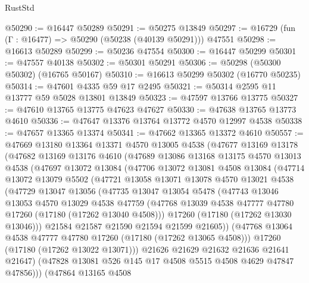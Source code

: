\begin{lexlean}{RustStd}
\begin{coremodule}
@50290 := @16447 @50289
@50291 := @50275 @13849
@50297 := @16729 (fun (Γ : @16477) => @50290 (@50238 (@40139 @50291))) @47551
@50298 := @16613 @50289
@50299 := @50236 @47554
@50300 := @16447 @50299
@50301 := @47557 @40138
@50302 := @50301 @50291
@50306 := @50298 (@50300 @50302) (@16765 @50167)
@50310 := @16613 @50299 @50302 (@16770 @50235)
@50314 := @47601 @4335 @59 @17 @2495
@50321 := @50314 @2595 @11 @13777 @59 @5028 @13801 @13849
@50323 := @47597 @13766 @13775
@50327 := @47610 @13765 @13775 @47623 @47627
@50330 := @47638 @13765 @13773 @4610
@50336 := @47647 @13376 @13764 @13772 @4570 @12997 @4538
@50338 := @47657 @13365 @13374
@50341 := @47662 @13365 @13372 @4610
@50557 := @47669
    @13180
    @13364
    @13371
    @4570
    @13005
    @4538
    (@47677
      @13169
      @13178
      (@47682
        @13169
        @13176
        @4610
        (@47689
          @13086
          @13168
          @13175
          @4570
          @13013
          @4538
          (@47697
            @13072
            @13084
            (@47706
              @13072
              @13081
              @4508
              @13084
              (@47714
                @13072
                @13079
                @5502
                (@47721
                  @13058
                  @13071
                  @13078
                  @4570
                  @13021
                  @4538
                  (@47729
                    @13047
                    @13056
                    (@47735
                      @13047
                      @13054
                      @5478
                      (@47743
                        @13046
                        @13053
                        @4570
                        @13029
                        @4538
                        @47759
                        (@47768 @13039 @4538 @47777 @47780 @17260 (@17180 (@17262 @13040 @4508)))
                        @17260
                        (@17180 (@17262 @13030 @13046)))
                      @21584
                      @21587
                      @21590
                      @21594
                      @21599
                      @21605))
                  (@47768 @13064 @4538 @47777 @47780 @17260 (@17180 (@17262 @13065 @4508)))
                  @17260
                  (@17180 (@17262 @13022 @13071)))
                @21626
                @21629
                @21632
                @21636
                @21641
                @21647)
              (@47828 @13081 @526 @145 @17 @4508 @5515 @4508 @4629 @47847 @47856)))
          (@47864
            @13165
            @4508

\end{coremodule}
\end{lexlean}
